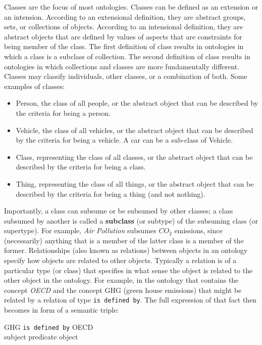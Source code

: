 \documentclass[preprint,12pt]{elsarticle}
\begin{document}
Classes are the focus of most ontologies. Classes can be defined as an extension or an intension. According to an extensional definition, they are abstract groups, sets, or collections of objects. According to an intensional definition, they are abstract objects that are defined by values of aspects that are constraints for being member of the class. The first definition of class results in ontologies in which a class is a subclass of collection. The second definition of class results in ontologies in which collections and classes are more fundamentally different. Classes may classify individuals, other classes, or a combination of both. Some examples of classes:
\begin{itemize}
\item Person, the class of all people, or the abstract object that can be described by the criteria for being a person.
\item Vehicle, the class of all vehicles, or the abstract object that can be described by the criteria for being a vehicle. A car can be a sub-class of Vehicle.
\item Class, representing the class of all classes, or the abstract object that can be described by the criteria for being a class.
\item Thing, representing the class of all things, or the abstract object that can be described by the criteria for being a thing (and not nothing).
\end{itemize}
Importantly, a class can subsume or be subsumed by other classes; a class subsumed by another is called a \textbf{subclass} (or subtype) of the subsuming class (or supertype). For example, \emph{Air Pollution} subsumes $CO_2$ emissions, since (necessarily) anything that is a member of the latter class is a member of the former. Relationships (also known as relations) between objects in an ontology specify how objects are related to other objects. Typically a relation is of a particular type (or class) that specifies in what sense the object is related to the other object in the ontology. For example, in the ontology that contains the concept \emph{OECD} and the concept GHG (green house emissions) that might be related by a relation of type \texttt{is defined by}. The full expression of that fact then becomes in form of a semantic triple:\\
\begin{center}
GHG \texttt{is defined by} OECD \\
subject \quad  predicate \quad object
\end{center}
\end{document}

